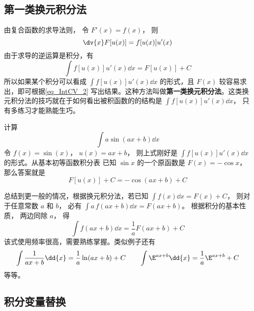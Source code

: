 
\subsection{第一类换元积分法}
由复合函数的求导法则， 令 $F'(x) = f(x)$， 则
\begin{equation}
\dv{x} F[u(x)] = f[u(x)]u'(x)
\end{equation}
由于求导的逆运算是积分，有
\begin{equation}\label{eq_IntCV_2}
\int f[u(x)]u'(x) \dd{x}  = F[u(x)] + C
\end{equation}
所以如果某个积分可以看成 $\int f[u(x)]u'(x) \dd{x}$ 的形式，且 $F(x)$ 较容易求出，即可根据\autoref{eq_IntCV_2} 写出结果。这种方法叫做\textbf{第一类换元积分法}。这类换元积分法的技巧就在于如何看出被积函数的的结构是 $\int f[u(x)]u'(x) \dd{x}$， 只有多练习才能熟能生巧。 

\begin{example}{}
计算
\begin{equation}
\int a\sin(ax + b) \dd{x}
\end{equation}
令 $f(x) = \sin(x)$， $u(x) = ax + b$， 则上式刚好是 $\int f[u(x)]u'(x) \dd{x}$ 的形式。从基本初等函数积分表 %
已知 $\sin x$ 的一个原函数是 $F(x) = -\cos x$， 那么答案就是
\begin{equation}
F[u(x)] + C =  - \cos(ax + b) + C
\end{equation}
\end{example}

总结到更一般的情况，根据换元积分法，若已知 $\int f(x) \dd{x}  = F(x) + C$， 则对于任意常数 $a$ 和 $b$， 必有 $\int a \,f(ax + b) \dd{x} = F(ax + b)$。 根据积分的基本性质，%
两边同除 $a$， 得
\begin{equation}\label{eq_IntCV_5}
\int f(ax + b) \dd{x} = \frac{1}{a} F(ax + b) + C
\end{equation}
该式使用频率很高，需要熟练掌握。类似例子还有
\begin{equation}
\int \frac{1}{ax+b} \dd{x} = \frac{1}{a}\ln (ax + b)+C  \qquad
\int \E^{ax + b} \dd{x} = \frac{1}{a} \E^{ax + b}+C
\end{equation}
等等。

\subsection{积分变量替换}

